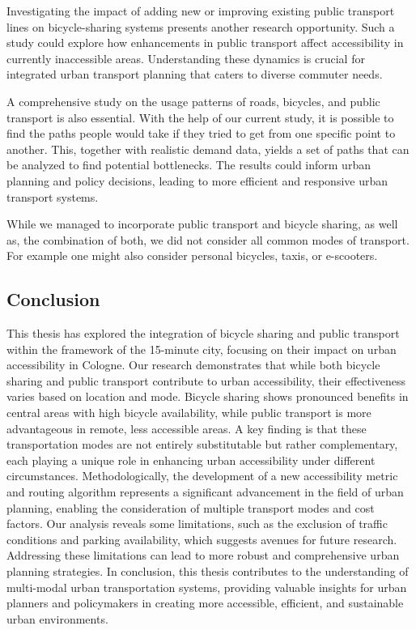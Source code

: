 Investigating the impact of adding new or improving existing public transport lines on bicycle-sharing systems presents another research opportunity. 
Such a study could explore how enhancements in public transport affect accessibility in currently inaccessible areas.
Understanding these dynamics is crucial for integrated urban transport planning that caters to diverse commuter needs.

A comprehensive study on the usage patterns of roads, bicycles, and public transport is also essential. 
With the help of our current study, it is possible to find the paths people would take if they tried to get from one specific point to another.
This, together with realistic demand data, yields a set of paths that can be analyzed to find potential bottlenecks.
The results could inform urban planning and policy decisions, leading to more efficient and responsive urban transport systems.

While we managed to incorporate public transport and bicycle sharing, as well as, the combination of both, we did not consider all common modes of transport.
For example one might also consider personal bicycles, taxis, or e-scooters.

\subsection{Conclusion}
\label{sec:conclusion}
This thesis has explored the integration of bicycle sharing and public transport within the framework of the 15-minute city, focusing on their impact on urban accessibility in Cologne.
Our research demonstrates that while both bicycle sharing and public transport contribute to urban accessibility, their effectiveness varies based on location and mode.
Bicycle sharing shows pronounced benefits in central areas with high bicycle availability, while public transport is more advantageous in remote, less accessible areas.
A key finding is that these transportation modes are not entirely substitutable but rather complementary, each playing a unique role in enhancing urban accessibility under different circumstances.
Methodologically, the development of a new accessibility metric and routing algorithm represents a significant advancement in the field of urban planning, enabling the consideration of multiple transport modes and cost factors.
Our analysis reveals some limitations, such as the exclusion of traffic conditions and parking availability, which suggests avenues for future research. Addressing these limitations can lead to more robust and comprehensive urban planning strategies.
In conclusion, this thesis contributes to the understanding of multi-modal urban transportation systems, providing valuable insights for urban planners and policymakers in creating more accessible, efficient, and sustainable urban environments.


